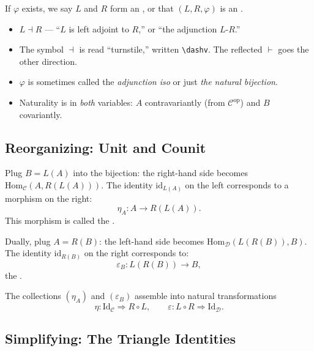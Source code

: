 If $\varphi$ exists, we say $L$ and $R$ form an , or
that $(L, R, \varphi)$ is an .

\begin{howtosay}
\begin{itemize}
  \item $L \dashv R$ --- ``$L$ is left adjoint to $R$,'' or
        ``the adjunction $L$-$R$.''
  \item The symbol $\dashv$ is read ``turnstile,'' written
        \texttt{\textbackslash dashv}. The reflected $\vdash$ goes the
        other direction.
  \item $\varphi$ is sometimes called the \emph{adjunction iso} or just
        \emph{the natural bijection}.
  \item Naturality is in \emph{both} variables: $A$ contravariantly
        (from $\mathcal{C}^{\mathrm{op}}$) and $B$ covariantly.
\end{itemize}
\end{howtosay}

\subsection{Reorganizing: Unit and Counit}

Plug $B = L(A)$ into the bijection: the right-hand side becomes
$\mathrm{Hom}_\mathcal{C}(A, R(L(A)))$. The identity $\mathrm{id}_{L(A)}$
on the left corresponds to a morphism on the right:
\begin{equation*}
  \eta_A : A \to R(L(A)).
\end{equation*}
This morphism is called the .

Dually, plug $A = R(B)$: the left-hand side becomes
$\mathrm{Hom}_\mathcal{D}(L(R(B)), B)$. The identity $\mathrm{id}_{R(B)}$
on the right corresponds to:
\begin{equation*}
  \varepsilon_B : L(R(B)) \to B,
\end{equation*}
the .

The collections $(\eta_A)$ and $(\varepsilon_B)$ assemble into natural
transformations
\begin{equation*}
  \eta : \mathrm{Id}_\mathcal{C} \Rightarrow R \circ L,
  \qquad
  \varepsilon : L \circ R \Rightarrow \mathrm{Id}_\mathcal{D}.
\end{equation*}

\subsection{Simplifying: The Triangle Identities}

